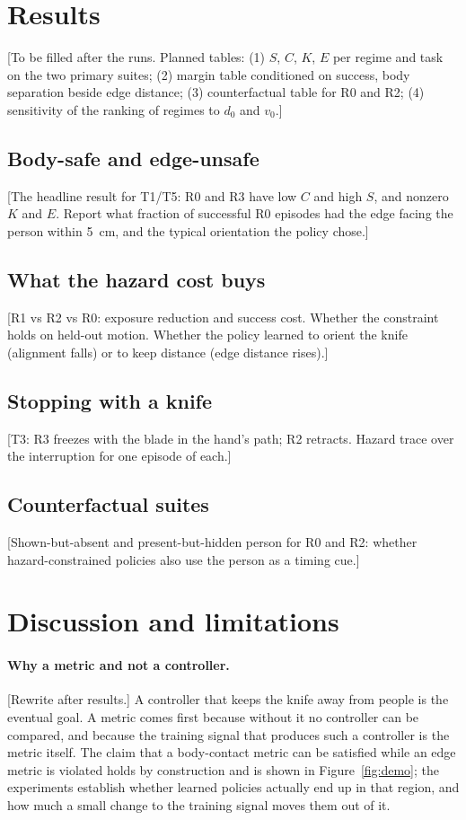 \documentclass[11pt,letterpaper]{article}
\newcommand{\todo}[1]{{\color{red}[#1]}}
\begin{document}
\section{Results}
\todo{To be filled after the runs. Planned tables: (1) $S$, $C$, $K$, $E$ per regime and task on the two primary suites; (2) margin table conditioned on success, body separation beside edge distance; (3) counterfactual table for R0 and R2; (4) sensitivity of the ranking of regimes to $d_0$ and $v_0$.}

\subsection{Body-safe and edge-unsafe}
\todo{The headline result for T1/T5: R0 and R3 have low $C$ and high $S$, and nonzero $K$ and $E$. Report what fraction of successful R0 episodes had the edge facing the person within 5~cm, and the typical orientation the policy chose.}

\subsection{What the hazard cost buys}
\todo{R1 vs R2 vs R0: exposure reduction and success cost. Whether the constraint holds on held-out motion. Whether the policy learned to orient the knife (alignment falls) or to keep distance (edge distance rises).}

\subsection{Stopping with a knife}
\todo{T3: R3 freezes with the blade in the hand's path; R2 retracts. Hazard trace over the interruption for one episode of each.}

\subsection{Counterfactual suites}
\todo{Shown-but-absent and present-but-hidden person for R0 and R2: whether hazard-constrained policies also use the person as a timing cue.}

\section{Discussion and limitations}
\paragraph{Why a metric and not a controller.}
\todo{Rewrite after results.} A controller that keeps the knife away from people is the eventual goal. A metric comes first because without it no controller can be compared, and because the training signal that produces such a controller is the metric itself. The claim that a body-contact metric can be satisfied while an edge metric is violated holds by construction and is shown in Figure~\ref{fig:demo}; the experiments establish whether learned policies actually end up in that region, and how much a small change to the training signal moves them out of it.
\end{document}
